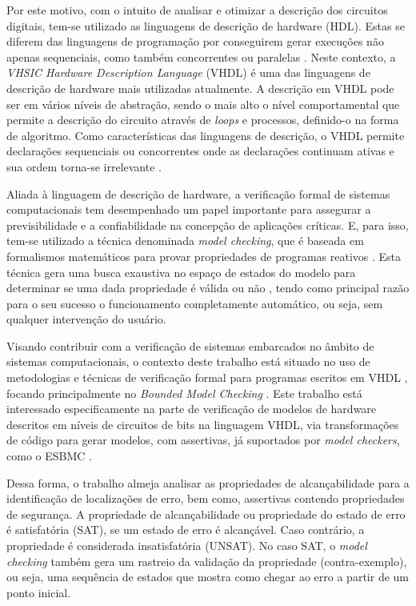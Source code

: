 \par
Por este motivo, com o intuito de analisar e otimizar a descrição dos circuitos digitais, tem-se utilizado as linguagens de descrição de hardware (HDL). Estas se diferem das linguagens de programação por conseguirem gerar execuções não apenas sequenciais, como também concorrentes ou paralelas \cite{chu2006rtl}.
% 
Neste contexto, a \textit{VHSIC Hardware Description Language} (VHDL) é uma das linguagens de descrição de hardware mais utilizadas atualmente. A descrição em VHDL pode ser em vários níveis de abstração, sendo o mais alto o nível comportamental que permite a descrição do circuito através de \textit{loops} e processos, definido-o na forma de algoritmo. Como características das linguagens de descrição, o VHDL permite declarações sequenciais ou concorrentes onde as declarações continuam ativas e sua ordem torna-se irrelevante \cite{cappelattipraticando}.

\par
Aliada à linguagem de descrição de hardware, a  verificação formal de sistemas computacionais tem desempenhado um papel importante para assegurar a previsibilidade e a confiabilidade na concepção de aplicações críticas. E, para isso, tem-se utilizado a técnica denominada \textit{model checking}, que é baseada em formalismos matemáticos para provar propriedades de programas reativos \cite{bensalem1999automatic}. Esta técnica gera uma busca exaustiva no espaço de estados do modelo para determinar se uma dada propriedade é válida ou não \cite{baier2008principles}, tendo como principal razão para o seu sucesso o funcionamento completamente automático, ou seja, sem qualquer intervenção do usuário.

\par
Visando contribuir com a verificação de sistemas embarcados no âmbito de sistemas computacionais, o contexto deste trabalho está situado no uso de metodologias e técnicas de verificação formal para programas escritos em VHDL \cite{biere2016aiger}, focando principalmente no \textit{Bounded Model Checking} \cite{cordeiro2012smt,rocha2015model}. Este trabalho está interessado especificamente na parte de verificação de modelos de hardware descritos em níveis de circuitos de bits na linguagem VHDL, via transformações de código para gerar modelos, com assertivas, já suportados por \textit{model checkers}, como o ESBMC \cite{cordeiro2012smt}. 

\par
Dessa forma, o trabalho almeja analisar as propriedades de alcançabilidade para a identificação de localizações de erro, bem como, assertivas contendo propriedades de segurança. A propriedade de alcançabilidade ou propriedade do estado de erro é satisfatória (SAT), se um estado de erro é alcançável. Caso contrário, a propriedade é considerada insatisfatória (UNSAT). No caso SAT, o \textit{model checking} também gera um rastreio da validação da propriedade (contra-exemplo), ou seja, uma sequência de estados que mostra como chegar ao erro a partir de um ponto inicial.


